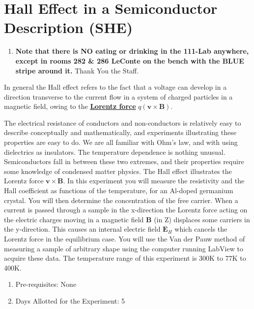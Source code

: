 \documentclass{../lab}
\begin{document}
\maketitle

\tableofcontents

\section{Hall Effect in a Semiconductor Description (SHE)}

\begin{enumerate}
    \item \textbf{Note that there is NO eating or drinking in the 111-Lab anywhere, except in rooms 282 \& 286 LeConte on the bench with the BLUE stripe around it.} Thank You the Staff.

\end{enumerate}

In general the Hall effect refers to the fact that a voltage can develop in a direction transverse to the current flow in a system of charged particles in a magnetic field, owing to the \href{http://www.britannica.com/science/Lorentz-force}{\textbf{Lorentz force}} $q(\mathbf{v} \times \mathbf{B})$.

The electrical resistance of conductors and non-conductors is relatively easy to describe conceptually and mathematically, and experiments illustrating these properties are easy to do. We are all familiar with Ohm's law, and with using dielectrics as insulators. The temperature dependence is nothing unusual. Semiconductors fall in between these two extremes, and their properties require some knowledge of condensed matter physics. The Hall effect illustrates the Lorentz force $\mathbf{v} \times \mathbf{B}$. In this experiment you will measure the resistivity and the Hall coefficient as functions of the temperature, for an Al-doped germanium crystal. You will then determine the concentration of the free carrier. When a current is passed through a sample in the x-direction the Lorentz force acting on the electric charges moving in a magnetic field \textbf{B} (in Z) displaces some carriers in the y-direction. This causes an internal electric field $\mathbf{E}_{H}$ which cancels the Lorentz force in the equilibrium case. You will use the Van der Pauw method of measuring a sample of arbitrary shape using the computer running LabView to acquire these data. The temperature range of this experiment is 300K to 77K to 400K.

\begin{enumerate}
    \item Pre-requisites: None

    \item Days Allotted for the Experiment: 5
\end{enumerate}
\end{document}
